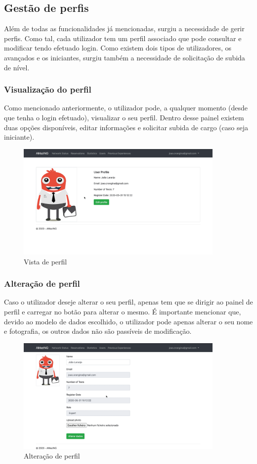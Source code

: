 \subsection{Gestão de perfis}
Além de todas  as funcionalidades já mencionadas, surgiu a necessidade de gerir perfis. Como tal, cada utilizador tem um perfil associado que pode consultar e modificar tendo efetuado login. Como existem dois tipos de utilizadores, os avançados e os iniciantes, surgiu também a necessidade de solicitação de subida de nível.
\subsubsection{Visualização do perfil}
Como mencionado anteriormente, o utilizador pode, a qualquer momento (desde que tenha o login efetuado), visualizar o seu perfil. Dentro desse painel existem duas opções disponíveis, editar informações e solicitar subida de cargo (caso seja iniciante).
\begin{figure}[!ht]
    \centering
    \includegraphics[width=0.9\textwidth]{images/my_profile.png}
    \caption{Vista de perfil}
    \label{fig:seeprofile}
\end{figure}
\subsubsection{Alteração de perfil}
Caso o utilizador deseje alterar o seu perfil, apenas tem que se dirigir ao painel de perfil e carregar no botão para alterar o mesmo. É importante mencionar que, devido ao modelo de dados escolhido, o utilizador pode apenas alterar o seu nome e fotografia, os outros dados não são passíveis de modificação.
\begin{figure}[!ht]
    \centering
    \includegraphics[width=0.9\textwidth]{images/edit_my_profile.png}
    \caption{Alteração de perfil}
    \label{fig:seeprofile}
\end{figure}

